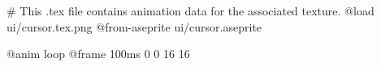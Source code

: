 # This .tex file contains animation data for the associated texture.
@load ui/cursor.tex.png
@from-aseprite ui/cursor.aseprite

@anim loop
	@frame 100ms 0 0 16 16
